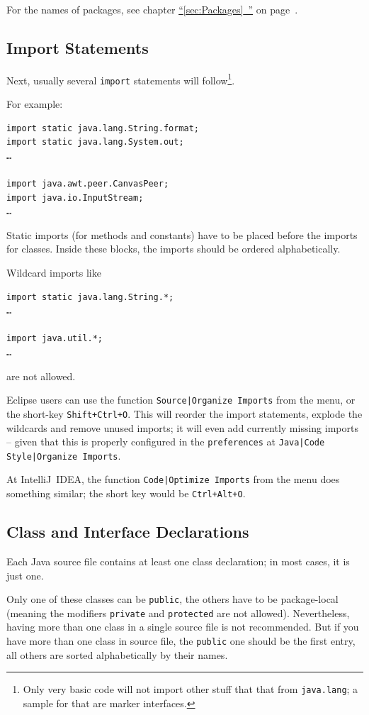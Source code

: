 \documentclass[11pt,a4paper, titlepage, parskip=half, headsepline, footsepline, cleardoublepage=current, headheight=1cm]{scrbook}
\newcommand*{\tqfullvref}[1]{\hyperref[{#1}]{“\ref*{#1}~\nameref*{#1}”} on page~\pageref{#1}}
\begin{document}
For the names of packages, see chapter \tqfullvref{sec:Packages}.

\subsection{Import Statements}\label{sec:ImportStatements}
Next, usually several \lstinline|import| statements will follow\footnote{Only very basic code will not import other stuff that that from \lstinline|java.lang|; a sample for that are marker interfaces.}. 

For example:

\begin{lstlisting}
import static java.lang.String.format;
import static java.lang.System.out;
…

import java.awt.peer.CanvasPeer;
import java.io.InputStream;
…
\end{lstlisting}

Static imports (for methods and constants) have to be placed before the imports for classes. Inside these blocks, the imports should be ordered alphabetically.

Wildcard imports like
\begin{lstlisting}
import static java.lang.String.*;
…

import java.util.*;
…
\end{lstlisting}
are not allowed.

Eclipse users can use the function \verb#Source|Organize Imports# from the menu, or the short-key \verb#Shift+Ctrl+O#. This will reorder the import statements, explode the wildcards and remove unused imports; it will even add currently missing imports – given that this is properly configured in the \verb#preferences# at \verb#Java|Code Style|Organize Imports#.

At IntelliJ~IDEA, the function \verb#Code|Optimize Imports# from the menu does something similar; the short key would be \verb#Ctrl+Alt+O#.

\subsection{Class and Interface Declarations}\label{sec:ClassAndInterfaceDeclarations}
Each Java source file contains at least one class declaration; in most cases, it is just one.

Only one of these classes can be \lstinline|public|, the others have to be package-local (meaning the modifiers \lstinline|private| and \lstinline|protected| are not allowed). Nevertheless, having more than one class in a single source file is not recommended. But if you have more than one class in source file, the \lstinline|public| one should be the first entry, all others are sorted alphabetically by their names.
\end{document}
